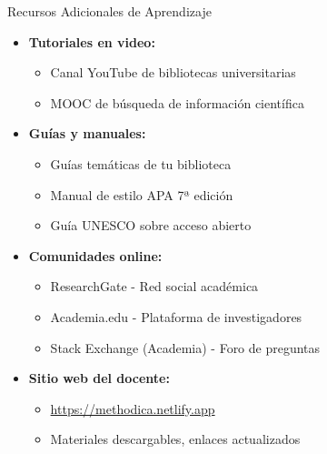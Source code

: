 \documentclass[11pt,aspectratio=169]{beamer}
\begin{document}
\begin{frame}{Recursos Adicionales de Aprendizaje}


	\small
	\begin{itemize}
		\item \textbf{Tutoriales en video:}
		      \begin{itemize}
			      \item Canal YouTube de bibliotecas universitarias
			      \item MOOC de búsqueda de información científica
		      \end{itemize}

		\item \textbf{Guías y manuales:}
		      \begin{itemize}
			      \item Guías temáticas de tu biblioteca
			      \item Manual de estilo APA 7ª edición
			      \item Guía UNESCO sobre acceso abierto
		      \end{itemize}

		\item \textbf{Comunidades online:}
		      \begin{itemize}
			      \item ResearchGate - Red social académica
			      \item Academia.edu - Plataforma de investigadores
			      \item Stack Exchange (Academia) - Foro de preguntas
		      \end{itemize}

		\item \textbf{Sitio web del docente:}
		      \begin{itemize}
			      \item \url{https://methodica.netlify.app}
			      \item Materiales descargables, enlaces actualizados
		      \end{itemize}
	\end{itemize}
\end{frame}

\end{document}
